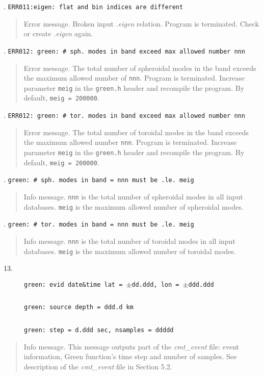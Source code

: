 . \texttt{ERR011:eigen: flat and bin indices are different}
\begin{quote}
Error message. Broken input {\it .eigen} relation. Program is
terminated. Check or create {\it .eigen} again.
\end{quote}
. \texttt{ERR012: green: \# sph. modes in band exceed max 
allowed number nnn}
\begin{quote}
Error message. The total number of spheroidal modes in the band exceeds the
maximum allowed
number of {\tt nnn}. Program is terminated. Increase parameter {\tt meig} in the
{\tt green.h} header and recompile the program. By default, {\tt meig = 200000}.
\end{quote}
. \texttt{ERR012: green: \# tor. modes in band exceed max allowed number nnn}
\begin{quote}
Error message. The total number of toroidal modes in the band exceeds 
the maximum allowed
number {\tt nnn}. Program is terminated. Increase parameter {\tt meig} in the
{\tt green.h} header and recompile the program. By default, {\tt meig = 200000}.
\end{quote}
. \texttt{green: \# sph. modes in band = nnn  must be .le. meig}
\begin{quote}
Info message. \texttt{nnn} is the total number of spheroidal modes in all
input databases. \texttt{meig} is the maximum allowed number of spheroidal modes.
\end{quote}
. \texttt{green: \# tor. modes in band = nnn  must be .le. meig}
\begin{quote}
Info message. \texttt{nnn} is the total number of toroidal modes in all
input databases. \texttt{meig} is the maximum allowed number of toroidal modes.
\end{quote}
\begin{description}
\item[13.] \texttt{green: evid date\&time lat = $\pm$dd.ddd, lon = $\pm$ddd.ddd}
\item[$\;\;\;\;\;$] \texttt{green:        source depth = ddd.d km}
\item[$\;\;\;\;\;$] \texttt{green: step =    d.ddd sec, nsamples =  ddddd}
\end{description}
\begin{quote}
Info message. This message outputs part of the {\it cmt\_event} file: 
event information, Green function's time step and number of samples. 
See description of the {\it cmt\_event} file in Section 5.2.
\end{quote}
